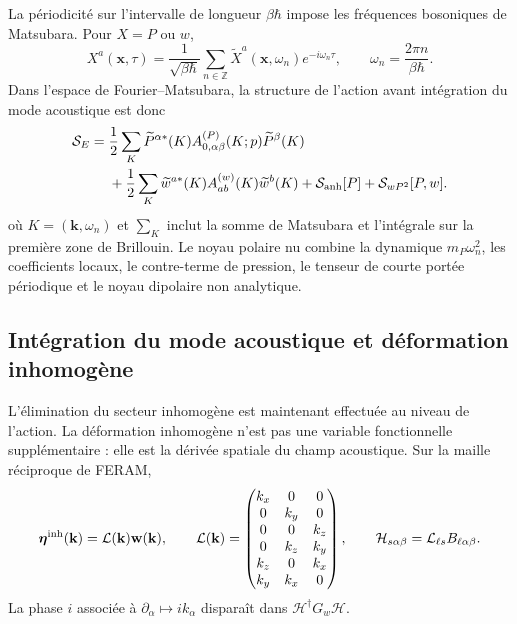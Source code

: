La périodicité sur l'intervalle de longueur $\beta\hbar$ impose les fréquences
bosoniques de Matsubara. Pour $X= P$ ou $w$,
\begin{equation}
X^a(\mathbf x,\tau)
=\frac{1}{\sqrt{\beta\hbar}}\sum_{n\in\mathbb Z}
\widetilde X^a(\mathbf x,\omega_n)e^{-i\omega_n\tau},
\qquad
\omega_n=\frac{2\pi n}{\beta\hbar}.
\label{eq:core_matsubara_transform}
\end{equation}
Dans l'espace de Fourier--Matsubara, la structure de l'action avant intégration
du mode acoustique est donc
\begin{equation}
\begin{aligned}
\mathcal S_E={}&
\frac12\sum_K\widetilde P^{\alpha *}(K)
A^{(P)}_{0,\alpha\beta}(K;p)\widetilde P^\beta(K)\\
&+\frac12\sum_K\widetilde w^{a*}(K)
A^{(w)}_{ab}(K)\widetilde w^b(K)
+\mathcal S_{\rm anh}[P]+\mathcal S_{wP^2}[P,w].
\end{aligned}
\label{eq:core_action_two_fields}
\end{equation}
où $K=(\mathbf k,\omega_n)$ et $\sum_K$ inclut la somme de Matsubara et
l'intégrale sur la première zone de Brillouin. Le noyau polaire nu combine la
dynamique $m_P\omega_n^2$, les coefficients locaux, le contre-terme de pression,
le tenseur de courte portée périodique et le noyau dipolaire non analytique.

\subsection{Intégration du mode acoustique et déformation inhomogène}

L'élimination du secteur inhomogène est maintenant effectuée au niveau de
l'action. La déformation inhomogène n'est pas une variable fonctionnelle supplémentaire :
elle est la dérivée spatiale du champ acoustique. Sur la maille réciproque de
FERAM,
\begin{equation}
\boldsymbol\eta^{\rm inh}(\mathbf k)
=\mathcal L(\mathbf k)\mathbf w(\mathbf k),
\qquad
\mathcal L(\mathbf k)=
\begin{pmatrix}
k_x&0&0\\
0&k_y&0\\
0&0&k_z\\
0&k_z&k_y\\
k_z&0&k_x\\
k_y&k_x&0
\end{pmatrix},
\qquad
\mathcal H_{s\alpha\beta}=\mathcal L_{\ell s}B_{\ell\alpha\beta}.
\label{eq:core_feram_strain_operator}
\end{equation}
La phase $i$ associée à $\partial_\alpha\mapsto ik_\alpha$ disparaît dans
$\mathcal H^\dagger G_w\mathcal H$.

